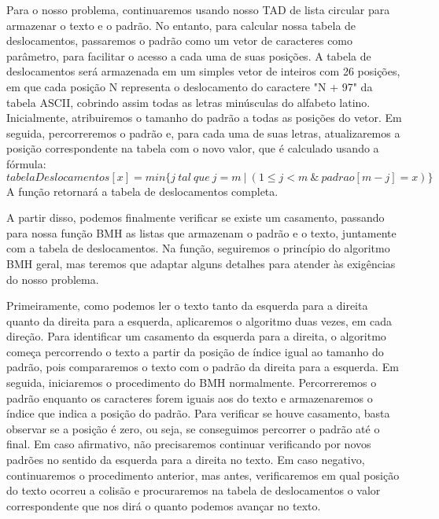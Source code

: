 \documentclass[12pt]{article}
\begin{document}
            Para o nosso problema, continuaremos usando nosso TAD de lista circular para armazenar o texto e o padrão. 
            No entanto, para calcular nossa tabela de deslocamentos, passaremos o padrão como um vetor de caracteres 
            como parâmetro, para facilitar o acesso a cada uma de suas posições. A tabela de deslocamentos será armazenada 
            em um simples vetor de inteiros com 26 posições, em que cada posição N representa o deslocamento do caractere 
            "N + 97" da tabela ASCII, cobrindo assim todas as letras minúsculas do alfabeto latino. 
            Inicialmente, atribuiremos o tamanho do padrão a todas as posições do vetor. Em seguida, percorreremos o 
            padrão e, para cada uma de suas letras, atualizaremos a posição correspondente na tabela com o novo valor, que 
            é calculado usando a fórmula:
            \begin{displaymath}
               tabelaDeslocamentos[x] = min\{j \ tal \ que \ j = m \ | \ (1 \leq j < m \ \& \ padrao[m - j] = x)\}
            \end{displaymath}
            A função retornará a tabela de deslocamentos completa. 
            
            A partir disso, podemos finalmente verificar se existe um casamento, passando para nossa função BMH as listas 
            que armazenam o padrão e o texto, juntamente com a tabela de deslocamentos. Na função, seguiremos o princípio 
            do algoritmo BMH geral, mas teremos que adaptar alguns detalhes para atender às exigências do nosso problema.
            
            Primeiramente, como podemos ler o texto tanto da esquerda para a direita quanto da direita para a esquerda, 
            aplicaremos o algoritmo duas vezes, em cada direção. Para identificar um casamento da esquerda para a direita, 
            o algoritmo começa percorrendo o texto a partir da posição de índice igual ao tamanho do padrão, pois 
            compararemos o texto com o padrão da direita para a esquerda. Em seguida, iniciaremos o procedimento do BMH 
            normalmente. Percorreremos o padrão enquanto os caracteres forem iguais aos do texto e armazenaremos o índice 
            que indica a posição do padrão. Para verificar se houve casamento, basta observar se a posição é zero, ou seja, 
            se conseguimos percorrer o padrão até o final. Em caso afirmativo, não precisaremos continuar verificando por 
            novos padrões no sentido da esquerda para a direita no texto. Em caso negativo, continuaremos o procedimento 
            anterior, mas antes, verificaremos em qual posição do texto ocorreu a colisão e procuraremos na tabela de 
            deslocamentos o valor correspondente que nos dirá o quanto podemos avançar no texto.
            
\end{document}
